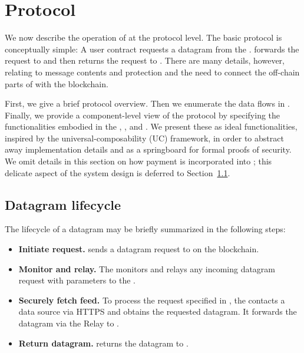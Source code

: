 

\section{\tc Protocol}

We now describe the operation of \tc at the protocol level. The basic protocol is conceptually simple: A user contract \reqcont requests a datagram from the \tcontract \tcont. \tcont forwards the request to \engine and then returns the request to \reqcont. There are many details, however, relating to message contents and protection and the need to connect the off-chain parts of \tc with the blockchain.

First, we give a brief protocol overview. Then we enumerate the data flows in \tc. Finally, we provide a component-level view of the protocol by specifying the functionalities embodied in the \tcontract, \medname, and \encname. We present these  as ideal functionalities, inspired by the universal-composability (UC) framework, in order to abstract away implementation details and as a springboard for formal proofs of security. We omit details in this section on how payment is incorporated into \tc; this delicate aspect of the system design is deferred to Section~\ref{}.

\subsection{Datagram lifecycle}

The lifecycle of a datagram may be briefly summarized in the following steps:

\begin{itemize}
\item {\bf Initiate request.} \reqcont sends a datagram request to \tcont on the blockchain.

\item {\bf Monitor and relay.} The \medname monitors \tcont and relays any incoming datagram request with parameters \dgform to the \encname.

\item {\bf Securely fetch feed.} To process the request specified in \dgform, the \encname contacts a data source via HTTPS and obtains the requested datagram. It forwards the datagram via the Relay to \tcont.

\item {\bf Return datagram.} \tcont returns the datagram to \reqcont.
\end{itemize}

